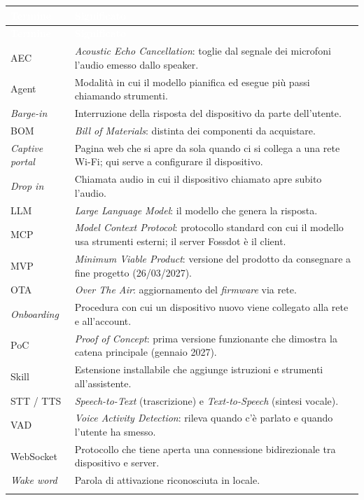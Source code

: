 \documentclass[12pt,a4paper]{article}
\newcommand{\thc}[1]{\textcolor{white}{\textbf{#1}}}
\newcommand{\rl}{\\ \arrayrulecolor{bfline}\hline}
\begin{document}
\begin{longtable}{>{\raggedright\arraybackslash}p{}>{\raggedright\arraybackslash}p{}}
\rowcolor{bfblue}\thc{Termine} & \thc{Significato} \\
\endfirsthead
\rowcolor{bfblue}\thc{Termine} & \thc{Significato} \\
\endhead
AEC & \emph{Acoustic Echo Cancellation}: toglie dal segnale dei microfoni l'audio emesso dallo speaker. \rl
Agent & Modalità in cui il modello pianifica ed esegue più passi chiamando strumenti. \rl
\emph{Barge-in} & Interruzione della risposta del dispositivo da parte dell'utente. \rl
BOM & \emph{Bill of Materials}: distinta dei componenti da acquistare. \rl
\emph{Captive portal} & Pagina web che si apre da sola quando ci si collega a una rete Wi-Fi; qui serve a configurare il dispositivo. \rl
\emph{Drop in} & Chiamata audio in cui il dispositivo chiamato apre subito l'audio. \rl
LLM & \emph{Large Language Model}: il modello che genera la risposta. \rl
MCP & \emph{Model Context Protocol}: protocollo standard con cui il modello usa strumenti esterni; il server Fossdot è il client. \rl
MVP & \emph{Minimum Viable Product}: versione del prodotto da consegnare a fine progetto (26/03/2027). \rl
OTA & \emph{Over The Air}: aggiornamento del \emph{firmware} via rete. \rl
\emph{Onboarding} & Procedura con cui un dispositivo nuovo viene collegato alla rete e all'account. \rl
PoC & \emph{Proof of Concept}: prima versione funzionante che dimostra la catena principale (gennaio 2027). \rl
Skill & Estensione installabile che aggiunge istruzioni e strumenti all'assistente. \rl
STT / TTS & \emph{Speech-to-Text} (trascrizione) e \emph{Text-to-Speech} (sintesi vocale). \rl
VAD & \emph{Voice Activity Detection}: rileva quando c'è parlato e quando l'utente ha smesso. \rl
WebSocket & Protocollo che tiene aperta una connessione bidirezionale tra dispositivo e server. \rl
\emph{Wake word} & Parola di attivazione riconosciuta in locale. \rl
\end{longtable}
\end{document}
